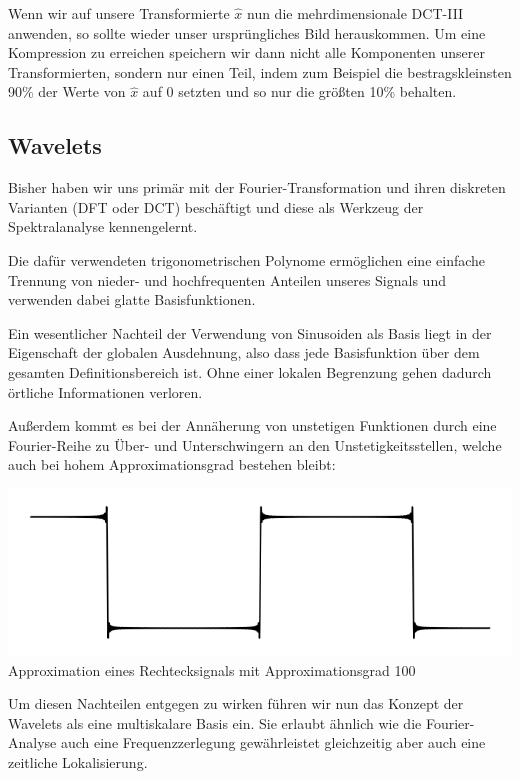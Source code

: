 Wenn wir auf unsere Transformierte $\hat{x}$ nun die mehrdimensionale DCT-III anwenden, so sollte wieder
unser ursprüngliches Bild herauskommen. Um eine Kompression zu erreichen speichern wir dann
nicht alle Komponenten unserer Transformierten, sondern nur einen Teil, indem zum Beispiel die
bestragskleinsten 90\% der Werte von $\hat{x}$ auf 0 setzten und so nur die größten 10\% behalten.

\subsection{Wavelets}
Bisher haben wir uns primär mit der Fourier-Transformation und ihren diskreten Varianten (DFT oder DCT) beschäftigt 
und diese als Werkzeug der Spektralanalyse kennengelernt. 

Die dafür verwendeten trigonometrischen Polynome ermöglichen eine einfache Trennung von nieder- und hochfrequenten 
Anteilen unseres Signals und verwenden dabei glatte Basisfunktionen. 

Ein wesentlicher Nachteil der Verwendung von Sinusoiden als Basis liegt in der Eigenschaft der globalen Ausdehnung, 
also dass jede Basisfunktion über dem gesamten Definitionsbereich \grqq{} ist. Ohne einer 
lokalen Begrenzung gehen dadurch örtliche Informationen verloren. 

\newpage

Außerdem kommt es bei der Annäherung von unstetigen Funktionen durch eine Fourier-Reihe zu
Über- und Unterschwingern an den Unstetigkeitsstellen, welche auch bei hohem Approximationsgrad
bestehen bleibt: \\

\begin{center}
  \includegraphics{figures/gibbsSquareWave100.png} \\
  \small Approximation eines Rechtecksignals mit Approximationsgrad 100
\end{center}

Um diesen Nachteilen entgegen zu wirken führen wir nun das Konzept der Wavelets als eine multiskalare Basis ein. 
Sie erlaubt ähnlich wie die Fourier-Analyse auch eine Frequenzzerlegung gewährleistet gleichzeitig aber auch eine 
zeitliche Lokalisierung. 

